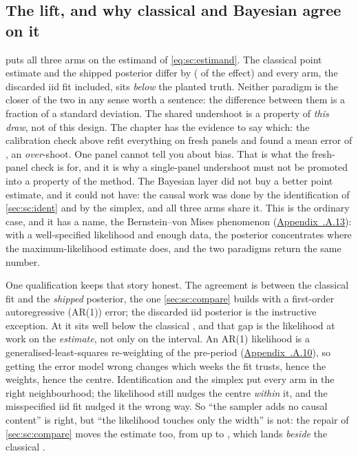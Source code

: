 

\subsection*{The lift, and why classical and Bayesian agree on it}

 puts all three arms on the estimand of \cref{eq:sc:estimand}. The classical
point estimate and the shipped posterior differ by \keur{\nbSevenEstDiff}
(\pc{\nbSevenEstDiffPct} of the effect) and every arm, the discarded iid fit included, sits
\emph{below} the planted truth. Neither paradigm is the closer of the two in any sense worth a
sentence: the difference between them is a fraction of a standard deviation. The shared undershoot
is a property of \emph{this draw}, not of this design. The chapter has the evidence to say
which: the calibration check above refit everything on \nbSevenNPanels{} fresh panels and found a
mean error of \keur{\nbSevenSeedBias}, an \emph{over}-shoot. One panel cannot tell you about bias.
That is what the fresh-panel check is for, and it is why a single-panel undershoot must not be
promoted into a property of the method. The
Bayesian layer did not buy a better point estimate, and it could not have: the causal work was
done by the identification of \cref{sec:sc:ident} and by the simplex, and all three arms share it.
This is the ordinary case, and it has a name, the Bernstein--von Mises phenomenon
\citep{gelman2013} (\hyperref[app:sc:bvm]{Appendix~\thechapter.A.13}): with a well-specified likelihood and enough data, the posterior concentrates
where the maximum-likelihood estimate does, and the two paradigms return the same number.

One qualification keeps that story honest. The agreement is between the classical fit and the
\emph{shipped} posterior, the one \cref{sec:sc:compare} builds with a first-order autoregressive
(AR(1)) error; the discarded iid posterior is the instructive exception. At
\keur{\nbSevenIidTotal} it sits well below the classical \keur{\nbSevenClTotal}, and that gap is the
likelihood at work on the \emph{estimate}, not only on the interval. An AR(1) likelihood is a
generalised-least-squares re-weighting of the pre-period (\hyperref[app:sc:ar1]{Appendix~\thechapter.A.10}),
so getting the error model wrong changes which weeks the fit trusts, hence the weights, hence the
centre. Identification and the simplex put every arm in the right neighbourhood; the likelihood still
nudges the centre \emph{within} it, and the misspecified iid fit nudged it the wrong way. So ``the
sampler adds no causal content'' is right, but ``the likelihood touches only the width'' is not: the
repair of \cref{sec:sc:compare} moves the estimate too, from \keur{\nbSevenIidTotal} up to
\keur{\nbSevenBayesTotal}, which lands \emph{beside} the classical \keur{\nbSevenClTotal}.

